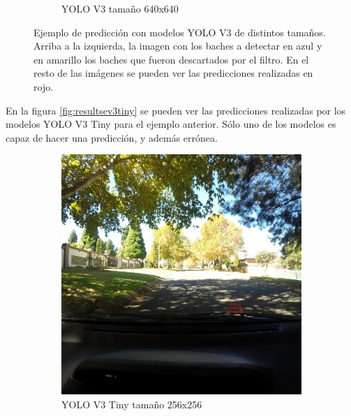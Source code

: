 \begin{figure}[H]
\begin{subfigure}[h]{0.45\linewidth}
		\caption{YOLO V3 tamaño 640x640}
	\end{subfigure}
	\caption{Ejemplo de predicción con modelos YOLO V3 de distintos tamaños. Arriba a la izquierda, la imagen con los baches a detectar en azul y en amarillo los baches que fueron descartados por el filtro. En el resto de las imágenes se pueden ver las predicciones realizadas en rojo.}
	\label{fig:resultsev3}
\end{figure}

En la figura \ref{fig:resultsev3tiny} se pueden ver las predicciones realizadas por los modelos YOLO V3 Tiny para el ejemplo anterior. Sólo uno de los modelos es capaz de hacer una predicción, y además errónea.

\begin{figure}[H]
	\centering
	\begin{subfigure}[h]{0.45\linewidth}
		\includegraphics[width=\linewidth]{images/results_e_yolo_v3_tiny_256.jpg}
		\caption{YOLO V3 Tiny tamaño 256x256}
	\end{subfigure}
	\begin{subfigure}[h]{0.45\linewidth}

\end{subfigure}
\end{figure}
